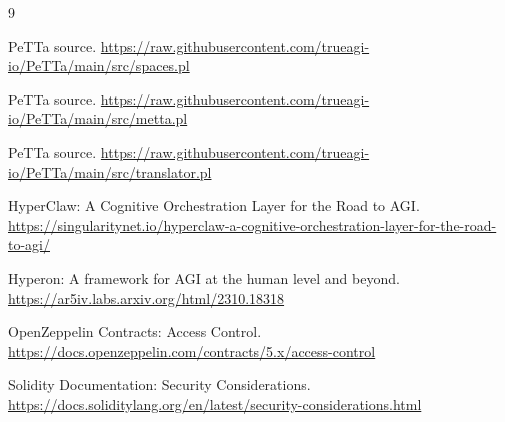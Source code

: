 \begin{thebibliography}{9}

PeTTa  source.\newline
\url{https://raw.githubusercontent.com/trueagi-io/PeTTa/main/src/spaces.pl}

PeTTa  source.\newline
\url{https://raw.githubusercontent.com/trueagi-io/PeTTa/main/src/metta.pl}

PeTTa  source.\newline
\url{https://raw.githubusercontent.com/trueagi-io/PeTTa/main/src/translator.pl}

HyperClaw: A Cognitive Orchestration Layer for the Road to AGI.\newline
\url{https://singularitynet.io/hyperclaw-a-cognitive-orchestration-layer-for-the-road-to-agi/}

Hyperon: A framework for AGI at the human level and beyond.\newline
\url{https://ar5iv.labs.arxiv.org/html/2310.18318}

OpenZeppelin Contracts: Access Control.\newline
\url{https://docs.openzeppelin.com/contracts/5.x/access-control}

Solidity Documentation: Security Considerations.\newline
\url{https://docs.soliditylang.org/en/latest/security-considerations.html}

\end{thebibliography}

